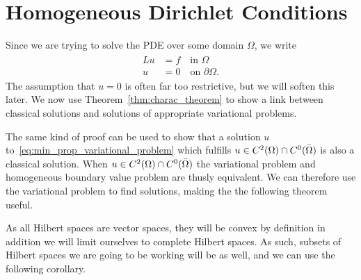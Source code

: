 \section{Homogeneous Dirichlet Conditions}
Since we are trying to solve the PDE over some domain $\Omega$, we write
\begin{align}
\begin{split}
    Lu &= f \quad \text{in } \Omega \label{eq:b_v_problem_homogeneous} \\
    u &= 0 \quad \text{on } \partial \Omega. 
\end{split}
\end{align}
The assumption that $u=0$ is often far too restrictive, but we will soften this later.
We now use Theorem~\ref{thm:charac_theorem} to show a link between classical 
solutions and solutions of appropriate variational problems.

The same kind of proof can be used to show that a solution $u$ to~\eqref{eq:min_prop_variational_problem} which fulfills 
$u\in C^2(\Omega) \cap C^0(\bar{\Omega})$ is also a classical solution. 
When $u\in C^2(\Omega) \cap C^0(\bar{\Omega})$ the variational problem and 
homogeneous boundary value problem are thusly equivalent.
We can therefore use the variational problem to find solutions, making the
 the following theorem useful.

As all Hilbert spaces are vector spaces, they will be convex by definition in addition we will limit ourselves to complete Hilbert spaces.
As such, subsets of Hilbert spaces we are going to be working will be as well,
and we can use the following corollary.


